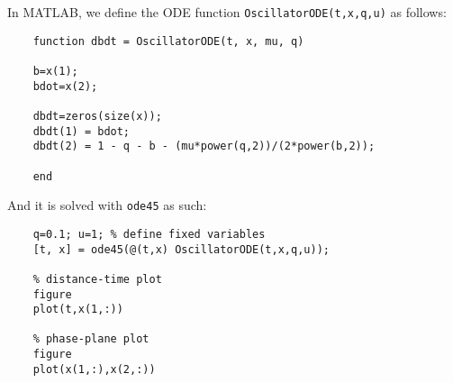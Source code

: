 \documentclass{report}
\begin{document}
In MATLAB, we define the ODE function \texttt{OscillatorODE(t,x,q,u)} as follows:


\begin{verbatim}
	function dbdt = OscillatorODE(t, x, mu, q)
	
	b=x(1);
	bdot=x(2);
	
	dbdt=zeros(size(x));
	dbdt(1) = bdot;
	dbdt(2) = 1 - q - b - (mu*power(q,2))/(2*power(b,2));
	
	end
\end{verbatim}

And it is solved with \texttt{ode45} as such:

\begin{verbatim}
	q=0.1; u=1; % define fixed variables
	[t, x] = ode45(@(t,x) OscillatorODE(t,x,q,u));
	
	% distance-time plot
	figure
	plot(t,x(1,:))
	
	% phase-plane plot
	figure
	plot(x(1,:),x(2,:))
\end{verbatim}
\end{document}
